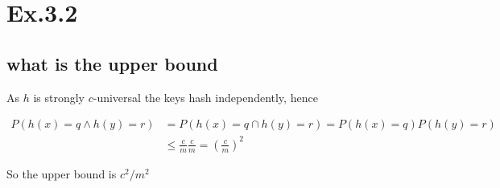 \section*{Ex.3.2}
\subsection*{what is the upper bound}

As $h$ is strongly $c$-universal the keys hash independently, hence

\begin{align*}
P(h(x)=q \land h(y)=r) &= P(h(x)=q \cap h(y)=r) = P(h(x)=q) P(h(y)=r) \\
                       &\leq \frac{c}{m} \frac{c}{m} = \left(\frac{c}{m}\right)^2
\end{align*}

So the upper bound is $c^2/m^2$